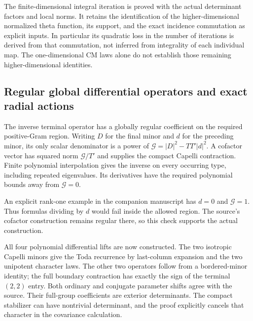 \documentclass[11pt,a4paper]{article}
\theoremstyle{remark}
\begin{document}
The finite-dimensional integral iteration is proved with the
actual determinant factors and local norms. It retains the
identification of the higher-dimensional normalized theta
function, its support, and the exact incidence commutation
as explicit inputs. In particular its quadratic loss in the
number of iterations is derived from that commutation, not
inferred from integrality of each individual map.
The one-dimensional CM laws alone do not establish those
remaining higher-dimensional identities.

\subsection{Regular global differential operators and exact radial actions}

The inverse terminal operator has a globally regular
coefficient on the required positive-Gram region. Writing
$D$ for the final minor and $d$ for the preceding minor, its
only scalar denominator is a power of
$\mathcal G=|D|^2-TT'|d|^2$. A cofactor vector has squared
norm $\mathcal G/T'$ and supplies the compact Capelli
contraction. Finite polynomial interpolation gives the inverse
on every occurring type, including repeated eigenvalues.
Its derivatives have the required polynomial bounds away from
$\mathcal G=0$.

An explicit rank-one example in the companion manuscript has
$d=0$ and $\mathcal G=1$. Thus formulas dividing by $d$
would fail inside the allowed region. The source's cofactor
construction remains regular there, so this check supports
the actual construction.

All four polynomial differential lifts are now constructed.
The two isotropic Capelli minors give the Toda recurrence by
last-column expansion and the two unipotent character laws.
The other two operators follow from a bordered-minor identity;
the full boundary contraction has exactly the sign of the
terminal $(2,2)$ entry. Both ordinary and conjugate parameter
shifts agree with the source. Their full-group coefficients
are exterior determinants. The compact stabilizer can have
nontrivial determinant, and the proof explicitly cancels that
character in the covariance calculation.
\end{document}
